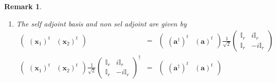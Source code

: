 \documentclass[aps,preprint]{revtex4}
\newtheorem{remark}[theorem]{Remark}
\begin{document}
\begin{remark}
\begin{enumerate}
\begin{enumerate}
\item The self adjoint basis and non sel adjoint are given by 
\begin{eqnarray}
\left( 
\begin{array}{cc}
\left( \boldsymbol{x}_{1}\right) ^{t} & \left( \boldsymbol{x}_{2}\right) ^{t}%
\end{array}%
\right) &=&\left( 
\begin{array}{cc}
\left( \boldsymbol{a}^{\dagger }\right) ^{t} & \left( \boldsymbol{a}\right)
^{t}%
\end{array}%
\right) \frac{1}{\sqrt{2}}\left( 
\begin{array}{cc}
\mathbb{I}_{r} & i\mathbb{I}_{r} \\ 
\mathbb{I}_{r} & -i\mathbb{I}_{r}%
\end{array}%
\right) \\
\left( 
\begin{array}{cc}
\left( \boldsymbol{x}_{1}\right) ^{t} & \left( \boldsymbol{x}_{2}\right) ^{t}%
\end{array}%
\right) \frac{1}{\sqrt{2}}\left( 
\begin{array}{cc}
\mathbb{I}_{r} & i\mathbb{I}_{r} \\ 
\mathbb{I}_{r} & -i\mathbb{I}_{r}%
\end{array}%
\right) ^{\dagger } &=&\left( 
\begin{array}{cc}
\left( \boldsymbol{a}^{\dagger }\right) ^{t} & \left( \boldsymbol{a}\right)
^{t}%
\end{array}%
\right)
\end{eqnarray}


\end{enumerate}
\end{enumerate}
\end{remark}
\end{document}
